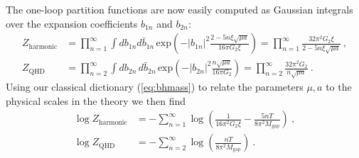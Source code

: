 \documentclass[12pt]{article}
\begin{document}
The one-loop partition functions are now easily computed as Gaussian integrals over the expansion coefficients $b_{1n}$ and $b_{2n}$:
\begin{equation}\begin{aligned}
	Z_\text{harmonic} &= \prod_{n=1}^\infty \int d b_{1n} d \bar{b}_{1n} \,\text{exp}\left(-|b_{1n}|^2 \frac{2-5 n \xi \sqrt{\mu a}}{16\pi G_2\xi}\right) = \prod_{n=1}^\infty \frac{32\pi^2 G_2 \xi}{2- 5n \xi \sqrt{\mu a}}~, \\
	Z_\text{QHD} &= \prod_{n=2}^\infty \int d b_{2n}\, d\bar{b}_{2n}\,\text{exp}\left(-|b_{2n}|^2 \frac{n \sqrt{\mu a}}{16\pi G_2}\right) = \prod_{n=2}^\infty \frac{32 \pi^2 G_2}{n \sqrt{\mu a}}~.
\end{aligned}\end{equation}
Using our classical dictionary (\ref{eq:bhmass}) to relate the parameters $\mu,a$ to the physical scales in the theory we then find 
\begin{equation}\begin{aligned}
	\log Z_\text{harmonic} &= -\sum_{n=1}^\infty \log \left(\frac{1}{16\pi^2 G_2 \xi} -\frac{5 n T}{8 \pi^2 M_\text{gap}}\right) ~, \\
	\log Z_\text{QHD} &= - \sum_{n=2}^\infty \log \left(\frac{n T}{8\pi^2 M_\text{gap}}\right)~.
\label{eq:zdisc}
\end{aligned}\end{equation}
\end{document}
